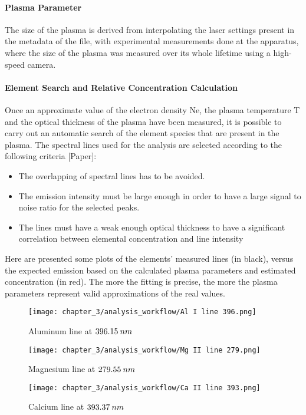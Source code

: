 \paragraph{Plasma Parameter}
\label{par:plasma_parameter}
The size of the plasma is derived from interpolating the laser settings present in the metadata of the file, with experimental measurements done at the apparatus, where the size of the plasma was measured over its whole lifetime using a high-speed camera.
\paragraph{Element Search and Relative Concentration Calculation}
Once an approximate value of the electron density Ne, the plasma temperature T and the optical thickness of the plasma have been measured, it is possible to carry out an automatic search of the element species that are present in the plasma. 
The spectral lines used for the analysis are selected according to the following criteria [Paper]:
\begin{itemize}
    \item The overlapping of spectral lines has to be avoided.
    \item The emission intensity must be large enough in order to have a large signal to noise ratio for the selected peaks.
    \item The lines must have a weak enough optical thickness to have a significant correlation between elemental concentration and line intensity
\end{itemize}

Here are presented some plots of the elements’ measured lines (in black), versus the expected emission based on the calculated plasma parameters and estimated concentration (in red). The more the fitting is precise, the more the plasma parameters represent valid approximations of the real values.

\begin{figure}[H]
    \centering
    \texttt{[image: chapter\_3/analysis\_workflow/Al I line 396.png]} 
    \caption{Aluminum line at $\protect 396.15 \:nm$}
    \label{fig:aluminum_line_lte}
\end{figure}
\begin{figure}[H]
    \centering
    \texttt{[image: chapter\_3/analysis\_workflow/Mg II line 279.png]} 
    \caption{Magnesium line at $\protect 279.55 \:nm$ }
    \label{fig:magnesium_line_lte}
\end{figure}
\begin{figure}[H]
    \centering
    \texttt{[image: chapter\_3/analysis\_workflow/Ca II line 393.png]} 
    \caption{Calcium line at $\protect 393.37 \:nm$ }
    \label{fig:calcium_line_lte}
\end{figure}

